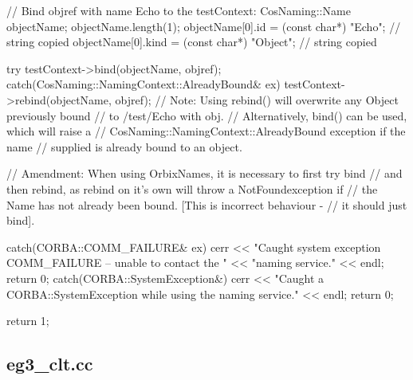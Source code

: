 \documentclass[11pt,twoside,a4paper]{book}
\begin{document}
\begin{cxxlisting}
{{    // Bind objref with name Echo to the testContext:
    CosNaming::Name objectName;
    objectName.length(1);
    objectName[0].id   = (const char*) "Echo";   // string copied
    objectName[0].kind = (const char*) "Object"; // string copied

    try {
      testContext->bind(objectName, objref);
    }
    catch(CosNaming::NamingContext::AlreadyBound& ex) {
      testContext->rebind(objectName, objref);
    }
    // Note: Using rebind() will overwrite any Object previously bound
    //       to /test/Echo with obj.
    //       Alternatively, bind() can be used, which will raise a
    //       CosNaming::NamingContext::AlreadyBound exception if the name
    //       supplied is already bound to an object.

    // Amendment: When using OrbixNames, it is necessary to first try bind
    // and then rebind, as rebind on it's own will throw a NotFoundexception if
    // the Name has not already been bound. [This is incorrect behaviour -
    // it should just bind].
  }
  catch(CORBA::COMM_FAILURE& ex) {
    cerr << "Caught system exception COMM_FAILURE -- unable to contact the "
         << "naming service." << endl;
    return 0;
  }
  catch(CORBA::SystemException&) {
    cerr << "Caught a CORBA::SystemException while using the naming service."
	 << endl;
    return 0;
  }

  return 1;
}
\end{cxxlisting}


\clearpage
\subsection{eg3\_clt.cc}
\end{document}
